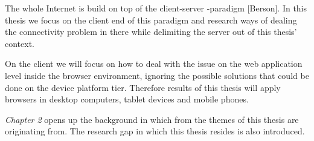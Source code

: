 The whole Internet is build on top of the client-server -paradigm [Berson]. In this thesis we focus on the client end of this paradigm and research ways of dealing the connectivity problem in there while delimiting the server out of this thesis' context. 

On the client we will focus on how to deal with the issue on the web application level inside the browser environment, ignoring the possible solutions that could be done on the device platform tier. Therefore results of this thesis will apply browsers in desktop computers, tablet devices and mobile phones.






\textit{Chapter 2} opens up the background in which from the themes of this thesis are originating from. The research gap in which this thesis resides is also introduced.



















